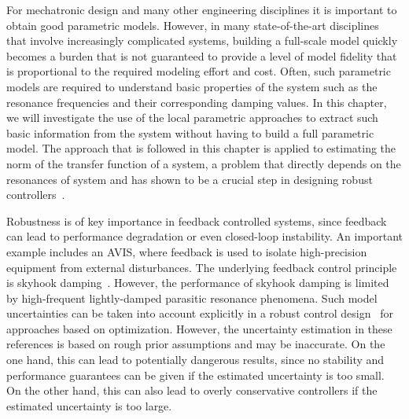 \newcommand{\wnValue}{\ensuremath{0.95 \unit{rad/s}}}
\newcommand{\dampingValue}{\ensuremath{0.025}}
\newcommand{\TsValue}{\ensuremath{1 \unit{s}}}


For mechatronic design and many other engineering disciplines it is important to obtain good parametric models.
However, in many state-of-the-art disciplines that involve increasingly complicated systems, building a full-scale model quickly becomes a burden that is not guaranteed to provide a level of model fidelity that is proportional to the required modeling effort and cost.
Often, such parametric models are required to understand basic properties of the system such as the resonance frequencies and their corresponding damping values.
In this chapter, we will investigate the use of the local parametric approaches to extract such basic information from the system without having to build a full parametric model.
The approach that is followed in this chapter is applied to estimating the \Hinf{} norm of the transfer function of a system, a problem that directly depends on the resonances of system and has shown to be a crucial step in designing robust controllers~\citep{Oomen2016}.

Robustness is of key importance in feedback controlled systems, since feedback can lead to performance degradation or even closed-loop instability.
An important example includes an \gls{AVIS}, where feedback is used to isolate high-precision equipment from external disturbances. 
The underlying feedback control principle is skyhook damping~\citep{Karnopp1995}. 
However, the performance of skyhook damping is limited by high-frequent lightly-damped parasitic resonance phenomena.
Such model uncertainties can be taken into account explicitly in a robust control design~\citep{Zhang2005HybridAvis} for approaches based on \Hinf{} optimization.
However, the uncertainty estimation in these references is based on rough prior assumptions and may be inaccurate. 
On the one hand, this can lead to potentially dangerous results, since no stability and performance guarantees can be given if the estimated uncertainty is too small. 
On the other hand, this can also lead to overly conservative controllers if the estimated uncertainty is too large.

